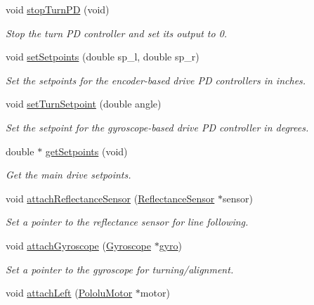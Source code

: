 \begin{DoxyCompactItemize}
void \hyperlink{class_drive_train_a74a6ee807665e54f51a1fc88284a5f04}{stop\+Turn\+PD} (void)
\begin{DoxyCompactList}\small\item\em Stop the turn PD controller and set its output to 0. \end{DoxyCompactList}\item 
void \hyperlink{class_drive_train_a824147fd2c57fe25c0f64a80218ca39e}{set\+Setpoints} (double sp\+\_\+l, double sp\+\_\+r)
\begin{DoxyCompactList}\small\item\em Set the setpoints for the encoder-\/based drive PD controllers in inches. \end{DoxyCompactList}\item 
void \hyperlink{class_drive_train_abaf93133223369df521ba2c8bcfea09d}{set\+Turn\+Setpoint} (double angle)
\begin{DoxyCompactList}\small\item\em Set the setpoint for the gyroscope-\/based drive PD controller in degrees. \end{DoxyCompactList}\item 
double $\ast$ \hyperlink{class_drive_train_a70eeb8cff983fd609f29734bde4751f2}{get\+Setpoints} (void)
\begin{DoxyCompactList}\small\item\em Get the main drive setpoints. \end{DoxyCompactList}\item 
void \hyperlink{class_drive_train_a0d74765628d030fdd1ef0877a3750e03}{attach\+Reflectance\+Sensor} (\hyperlink{class_reflectance_sensor}{Reflectance\+Sensor} $\ast$sensor)
\begin{DoxyCompactList}\small\item\em Set a pointer to the reflectance sensor for line following. \end{DoxyCompactList}\item 
void \hyperlink{class_drive_train_a088f6c9f4d7aafb1e5848a3d15d3e9c5}{attach\+Gyroscope} (\hyperlink{class_gyroscope}{Gyroscope} $\ast$\hyperlink{class_drive_train_a7fca76321e3bf08c0bcdc645b9e70b1d}{gyro})
\begin{DoxyCompactList}\small\item\em Set a pointer to the gyroscope for turning/alignment. \end{DoxyCompactList}\item 
void \hyperlink{class_drive_train_a874a58662b26684892d2efbce8fde36f}{attach\+Left} (\hyperlink{class_pololu_motor}{Pololu\+Motor} $\ast$motor)

\end{DoxyCompactItemize}
